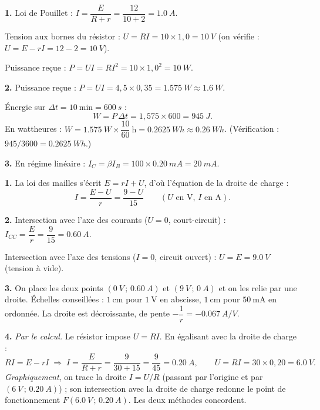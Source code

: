 \documentclass[11pt]{article}
\begin{document}
\begin{corrige}
\textbf{1.} Loi de Pouillet : $I = \dfrac{E}{R+r} = \dfrac{12}{10+2} = \SI{1,0}{A}$.

Tension aux bornes du résistor : $U = RI = 10 \times 1,0 = \SI{10}{V}$ (on vérifie : $U = E - rI = 12 - 2 = \SI{10}{V}$).

Puissance reçue : $P = UI = RI^2 = 10 \times 1,0^2 = \SI{10}{W}$.

\textbf{2.} Puissance reçue : $P = UI = 4,5 \times 0,35 = \SI{1,575}{W} \approx \SI{1,6}{W}$.

Énergie sur $\Delta t = 10~\text{min} = \SI{600}{s}$ :
\[ W = P\,\Delta t = 1,575 \times 600 = \SI{945}{J}. \]
En wattheures : $W = \SI{1,575}{W} \times \dfrac{10}{60}~\text{h} = \SI{0,2625}{Wh} \approx \SI{0,26}{Wh}$. (Vérification : $945/3600 = \SI{0,2625}{Wh}$.)

\textbf{3.} En régime linéaire : $I_C = \beta I_B = 100 \times \SI{0,20}{mA} = \SI{20}{mA}$.
\end{corrige}

\begin{corrige}
\textbf{1.} La loi des mailles s'écrit $E = rI + U$, d'où l'équation de la droite de charge :
\[ I = \frac{E - U}{r} = \frac{9 - U}{15} \qquad (U \text{ en V},\, I \text{ en A}). \]

\textbf{2.} Intersection avec l'axe des courants ($U = 0$, court-circuit) : $I_{CC} = \dfrac{E}{r} = \dfrac{9}{15} = \SI{0,60}{A}$.

Intersection avec l'axe des tensions ($I = 0$, circuit ouvert) : $U = E = \SI{9,0}{V}$ (tension à vide).

\textbf{3.} On place les deux points $(\SI{0}{V}\,;\,\SI{0,60}{A})$ et $(\SI{9}{V}\,;\,\SI{0}{A})$ et on les relie par une droite. Échelles conseillées : $1~\text{cm}$ pour $1~\text{V}$ en abscisse, $1~\text{cm}$ pour $50~\text{mA}$ en ordonnée. La droite est décroissante, de pente $-\dfrac{1}{r} = -\SI{0,067}{A/V}$.

\textbf{4.} \emph{Par le calcul.} Le résistor impose $U = RI$. En égalisant avec la droite de charge :
\[ RI = E - rI \;\Longrightarrow\; I = \frac{E}{R+r} = \frac{9}{30+15} = \frac{9}{45} = \SI{0,20}{A}, \qquad U = RI = 30 \times 0,20 = \SI{6,0}{V}. \]
\emph{Graphiquement}, on trace la droite $I = U/R$ (passant par l'origine et par $(\SI{6}{V}\,;\,\SI{0,20}{A})$) ; son intersection avec la droite de charge redonne le point de fonctionnement $F(\SI{6,0}{V}\,;\,\SI{0,20}{A})$. Les deux méthodes concordent.
\end{corrige}
\end{document}
